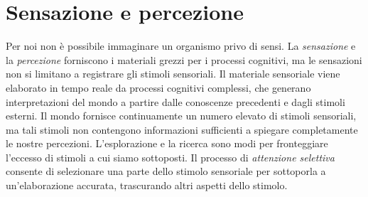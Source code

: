 \documentclass[a4paper]{article}
\begin{document}
\section{Sensazione e percezione}
Per noi non è possibile immaginare un organismo privo di sensi. La \emph{sensazione} e la \emph{percezione} forniscono i materiali grezzi per i processi cognitivi, ma le sensazioni non si limitano a registrare gli stimoli sensoriali.
Il materiale sensoriale viene elaborato in tempo reale da processi cognitivi complessi, che generano interpretazioni del mondo a partire dalle conoscenze precedenti e dagli stimoli esterni.
Il mondo fornisce continuamente un numero elevato di stimoli sensoriali, ma tali stimoli non contengono informazioni sufficienti a spiegare completamente le nostre percezioni.
L'esplorazione e la ricerca sono modi per fronteggiare l'eccesso di stimoli a cui siamo sottoposti. Il processo di \emph{attenzione selettiva} consente di selezionare una parte dello stimolo sensoriale per sottoporla a un'elaborazione accurata, trascurando altri aspetti dello stimolo.
\end{document}
